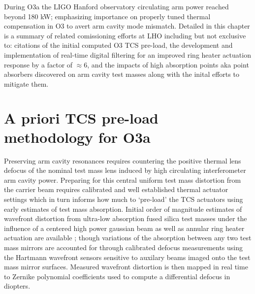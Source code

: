 



During O3a the LIGO Hanford observatory circulating arm power reached beyond 180 kW; emphasizing importance on properly tuned thermal compensation in O3 to avert arm cavity mode mismatch. Detailed in this chapter is a summary of related comissioning efforts at LHO including but not exclusive to: citations of the initial computed O3 TCS pre-load, the development and implementation of real-time digital filtering for an improved ring heater actuation response by a factor of $\approx 6$, and the impacts of high absorption points aka point absorbers discovered on arm cavity test masses along with the inital efforts to mitigate them. 

\section{A priori TCS pre-load methodology for O3a}
Preserving arm cavity resonances requires countering the positive thermal lens defocus of the nominal test mass lens induced by high circulating interferometer arm cavity power. Preparing for this central uniform test mass distortion from the carrier beam requires calibrated and well established thermal actuator settings which in turn informs how much to `pre-load' the TCS actuators using early estimates of test mass absorption. Initial order of magnitude estimates of wavefront distortion from ultra-low absorption fused silica test masses under the influence of a centered high power gaussian beam as well as annular ring heater actuation are available \cite{hellovinet:1990, ramette:2016}; though variations of the absorption between any two test mass mirrors are accounted for through calibrated defocus measurements using the Hartmann wavefront sensors sensitive to auxilary beams imaged onto the test mass mirror surfaces. Measured wavefront distortion is then mapped in real time to Zernike polynomial coefficients used to compute a differential defocus in diopters.


